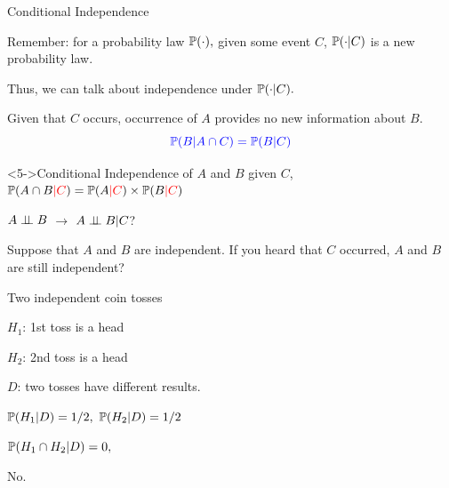 \documentclass[fleqn,aspectratio=169]{beamer}
\begin{document}
\begin{frame}{Conditional Independence}

\plitemsep 0.07in
\bci 

\item<2-> Remember: for a probability law $\mathbb{P}( \cdot ),$ given some event $C$, $\mathbb{P}( \cdot | C )$ is a new probability law. 

\item<3-> Thus, we can talk about independence under $\mathbb{P}( \cdot | C ).$

\item<4-> Given that $C$ occurs, occurrence of $A$ provides no new information about $B.$
$$
{\color{blue} \mathbb{P}( B | A \cap C ) = \mathbb{P}( B | C )}
$$
\vspace{-0.2in}

\item {}

\begin{block}<5->{Conditional Independence of $A$ and $B$ given $C$, }
$\mathbb{P}( A \cap B {\color{red} | C} ) = \mathbb{P}( A {\color{red} |C} ) \times \mathbb{P}( B {\color{red} |C} )$
\end{block}




\eci 
\end{frame}

\begin{frame}{ $A \perp \!\!\! \perp B$ $\rightarrow$  $A \perp \!\!\! \perp B | C$?}

\plitemsep 0.2in
\bci 

\item Suppose that $A$ and $B$ are independent. If you heard that $C$ occurred,  $A$ and $B$ are still independent? 

\item<2-> Two independent coin tosses

\plitemsep 0.05in
\bci
\item $H_1$: 1st toss is a head
\item $H_2$: 2nd toss is a head
\item $D$: two tosses have different results.
\eci

\item<3-> $\mathbb{P}( H_1 | D ) = 1/2,$ $\mathbb{P}( H_2 | D ) = 1/2$  


\item<4-> $\mathbb{P}( H_1 \cap H_2 | D ) = 0,$  

\item<5-> No.
\eci 
\end{frame}
\end{document}
